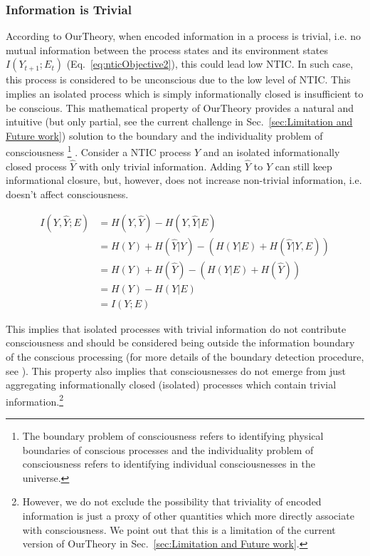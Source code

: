 \documentclass[utf8]{article}
\begin{document}
            \subsubsection*{Information is Trivial}
                According to \ac{OurTheory}, when encoded information in a process is trivial, i.e. no mutual information between the process states and its environment states $I(Y_{t+1};E_{t})$ (Eq.~\ref{eq:nticObjective2}), this could lead low NTIC. In such case, this process is considered to be unconscious due to the low level of NTIC. This implies an isolated process which is simply informationally closed is insufficient to be conscious. 
                This mathematical property of \ac{OurTheory} provides a natural and intuitive (but only partial, see the current challenge in  Sec.~\ref{sec:Limitation and Future work}) solution to the boundary and the individuality problem of consciousness
                    \footnote{The boundary problem of consciousness refers to identifying physical boundaries of conscious processes and the individuality problem of consciousness refers to identifying individual consciousnesses in the universe.}
                \citep{Raymont2006-RAYUOC}. Consider a NTIC process $Y$ and an isolated informationally closed process $\hat{Y}$ with only trivial information. Adding $\hat{Y}$ to $Y$ can still keep informational closure, but, however, does not increase non-trivial information, i.e. doesn't affect consciousness. 
                
    			\begin{equation}
    			    \begin{aligned}
                        I(Y,\hat{Y};E) & = H(Y,\hat{Y}) - H(Y,\hat{Y}|E) \\
                                       & = H(Y) + H(\hat{Y}|Y) - (H(Y|E)+H(\hat{Y}|Y,E)) \\
                                       & = H(Y) + H(\hat{Y}) - (H(Y|E)+H(\hat{Y})) \\
                                       & = H(Y) - H(Y|E)\\
                                       & = I(Y;E)				
    				\end{aligned}
    			\end{equation}
                
                This implies that isolated processes with trivial information do not contribute consciousness and should be considered being outside the information boundary of the conscious processing (for more details of the boundary detection procedure, see \cite{krakauer2014information}). 
                This property also implies that consciousnesses do not emerge from just aggregating informationally closed (isolated) processes which contain trivial information.\footnote{However, we do not exclude the possibility that triviality of encoded information is just a proxy of other quantities which more directly associate with consciousness. We point out that this is a limitation of the current version of \ac{OurTheory} in Sec.~\ref{sec:Limitation and Future work}.}
                
\end{document}
